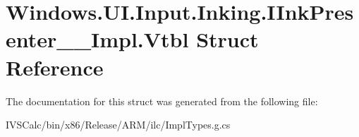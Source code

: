 \hypertarget{struct_windows_1_1_u_i_1_1_input_1_1_inking_1_1_i_ink_presenter_____impl_1_1_vtbl}{}\section{Windows.\+U\+I.\+Input.\+Inking.\+I\+Ink\+Presenter\+\_\+\+\_\+\+Impl.\+Vtbl Struct Reference}
\label{struct_windows_1_1_u_i_1_1_input_1_1_inking_1_1_i_ink_presenter_____impl_1_1_vtbl}


The documentation for this struct was generated from the following file\+:\begin{DoxyCompactItemize}
\item 
I\+V\+S\+Calc/bin/x86/\+Release/\+A\+R\+M/ilc/Impl\+Types.\+g.\+cs\end{DoxyCompactItemize}

